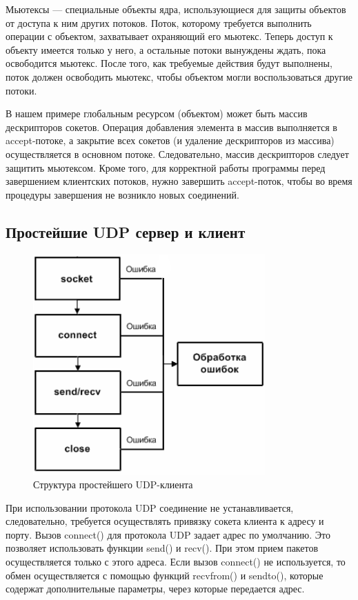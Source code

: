 \documentclass[a4paper]{article}
\begin{document}
Мьютексы — специальные объекты ядра, использующиеся для защиты объектов от доступа к ним других потоков. Поток, которому требуется выполнить операции с объектом, захватывает охраняющий его мьютекс. Теперь доступ к объекту имеется только у него, а остальные потоки вынуждены ждать, пока освободится мьютекс. После того, как требуемые действия будут выполнены, поток должен освободить мьютекс, чтобы объектом могли воспользоваться другие потоки. 

В нашем примере глобальным ресурсом (объектом) может быть массив дескрипторов сокетов. Операция добавления элемента в массив выполняется в accept-потоке, а закрытие всех сокетов (и удаление дескрипторов из массива) осуществляется в основном потоке. Следовательно, массив дескрипторов следует защитить мьютексом. Кроме того, для корректной работы программы перед завершением клиентских потоков, нужно завершить accept-поток, чтобы во время процедуры завершения не возникло новых соединений.
\subsection{Простейшие UDP сервер и клиент}
\begin{figure}[H]
\begin{center}
\includegraphics[scale=0.5]{pics/tudpc.png}
\caption{Структура простейшего UDP-клиента}
\label{pic:tudpc}
\end{center}
\end{figure}

При использовании протокола UDP соединение не устанавливается, следовательно, требуется осуществлять привязку сокета клиента к адресу и порту. Вызов connect() для протокола UDP задает адрес по умолчанию. Это позволяет использовать функции send() и recv(). При этом прием пакетов осуществляется только с этого адреса. Если вызов connect() не используется, то обмен осуществляется с помощью функций recvfrom() и sendto(), которые содержат дополнительные параметры, через которые передается адрес.
\end{document}
